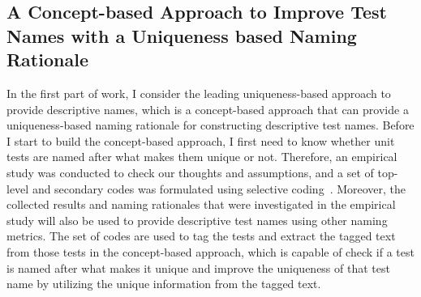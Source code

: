 \subsection{A Concept-based Approach to Improve Test Names with a Uniqueness based Naming Rationale}
\label{sec:unique-test-name}

In the first part of work, I consider the leading uniqueness-based approach to provide descriptive names, which is a concept-based approach that can provide a uniqueness-based naming rationale for constructing descriptive test names.
%
Before I start to build the concept-based approach, I first need to know whether unit tests are named after what makes them unique or not.
%
Therefore, an empirical study was conducted to check our thoughts and assumptions, and a set of top-level and secondary codes was formulated using selective coding~\cite{glaser1967discovery,strauss1998basics}.
%
Moreover, the collected results and naming rationales that were investigated in the empirical study will also be used to provide descriptive test names using other naming metrics.
%
The set of codes are used to tag the tests and extract the tagged text from those tests in the concept-based approach, which is capable of check if a test is named after what makes it unique and improve the uniqueness of that test name by utilizing the unique information from the tagged text.